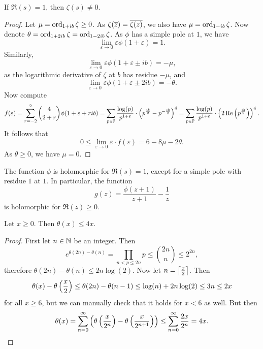 \begin{izrek}
If $\Re(s) = 1$, then $\zeta(s) \ne 0$.
\end{izrek}

\begin{proof}
Let $\mu = \operatorname{ord}_{1 + ib} \zeta \geq 0$. As
$\zeta(\overline{z}) = \overline{\zeta(z)}$, we also have
$\mu = \operatorname{ord}_{1 - ib} \zeta$. Now denote
$\theta = \operatorname{ord}_{1 + 2ib} \zeta = \operatorname{ord}_{1 - 2ib} \zeta$. As $\phi$
has a simple pole at $1$, we have
\[
\lim_{\varepsilon \to 0} \varepsilon \phi(1+\varepsilon) = 1.
\]
Similarly,
\[
\lim_{\varepsilon \to 0} \varepsilon \phi(1 + \varepsilon \pm ib) =
-\mu,
\]
as the logarithmic derivative of $\zeta$ at $b$ has residue $-\mu$,
and
\[
\lim_{\varepsilon \to 0}
\varepsilon \phi(1 + \varepsilon \pm 2ib) =
-\theta.
\]
Now compute
\[
f(\varepsilon) =
\sum_{r=-2}^2 \binom{4}{2+r} \phi(1 + \varepsilon + rib) =
\sum_{p \in \mathbb{P}} \frac{\log(p)}{p^{1+\varepsilon}} \cdot
\left(p^{\frac{ib}{2}} - p^{-\frac{ib}{2}}\right)^4 =
\sum_{p \in \mathbb{P}} \frac{\log(p)}{p^{1+\varepsilon}} \cdot
\left(2 \operatorname{Re} \left(p^{\frac{ib}{2}}\right)\right)^4.
\]
It follows that
\[
0 \leq
\lim_{\varepsilon \to 0} \varepsilon \cdot f(\varepsilon) =
6 - 8 \mu - 2 \theta.
\]
As $\theta \geq 0$, we have $\mu = 0$.
\end{proof}

\begin{posledica}
\label{prime:cor:g_def}
The function $\phi$ is holomorphic for $\Re(s) = 1$, except for a
simple pole with residue $1$ at $1$. In particular, the function
\[
g(z) = \frac{\phi(z+1)}{z+1} - \frac{1}{z}
\]
is holomorphic for $\Re(z) \geq 0$.
\end{posledica}

\obvs


\begin{lema}
Let $x \geq 0$. Then $\theta(x) \leq 4x$.
\end{lema}

\begin{proof}
First let $n \in \mathbb{N}$ be an integer. Then
\[
e^{\theta(2n) - \theta(n)} =
\prod_{n < p \leq 2n} p \leq
\binom{2n}{n} \leq
2^{2n},
\]
therefore $\theta(2n) - \theta(n) \leq 2n \log(2)$. Now let
$n = \left\lceil \frac{x}{2}\right\rceil$. Then
\[
\theta(x) - \theta \left(\frac{x}{2}\right) \leq
\theta(2n) - \theta(n-1) \leq
\log(n) + 2n \log(2) \leq
3n \leq
2x
\]
for all $x \geq 6$, but we can manually check that it holds for
$x < 6$ as well. But then
\[
\theta(x) =
\sum_{n=0}^\infty
\left(\theta \left(\frac{x}{2^n}\right) - \theta \left(\frac{x}{2^{n+1}}\right)\right) \leq
\sum_{n=0}^\infty \frac{2x}{2^n} =
4x. \qedhere
\]
\end{proof}


